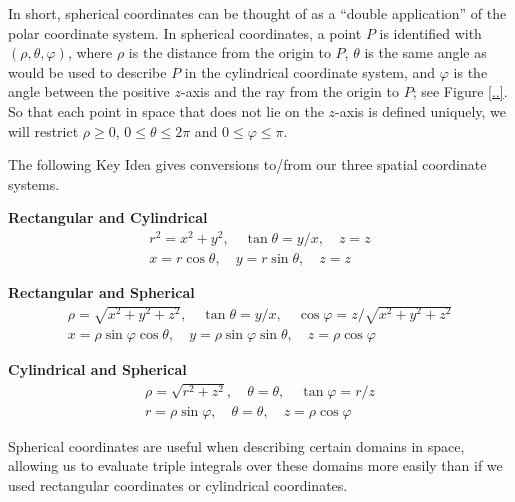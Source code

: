In short, spherical coordinates can be thought of as a ``double application'' of the polar coordinate system. In spherical coordinates, a point $P$ is identified with $(\rho,\theta,\varphi)$, where $\rho$ is the distance from the origin to $P$, $\theta$ is the same angle as would be used to describe $P$ in the cylindrical coordinate system, and $\varphi$ is the angle between the positive $z$-axis and the ray from the origin to $P$; see Figure \ref{..}. So that each point in space that does not lie on the $z$-axis is defined uniquely, we will restrict $\rho \geq 0$, $0 \leq \theta \leq 2\pi$ and $0 \leq \varphi \leq \pi$.

The following Key Idea gives conversions to/from our three spatial coordinate systems.

{\textbf{Rectangular and Cylindrical}
$$\begin{array}{c}
r^2 = x^2+y^2,\quad \tan \theta = y/x,\quad z=z\\
x=r\cos \theta, \quad y=r\sin\theta,\quad z=z
\end{array}$$

\textbf{Rectangular and Spherical}
$$\begin{array}{c}
\rho = \sqrt{x^2+y^2+z^2},\quad \tan \theta = y/x,\quad \cos \varphi = z/\sqrt{x^2+y^2+z^2}\\
x=\rho\sin\varphi\cos\theta,\quad y=\rho\sin\varphi\sin\theta,\quad z=\rho\cos\varphi
\end{array}$$

\textbf{Cylindrical and Spherical }
$$\begin{array}{c}
\rho=\sqrt{r^2+z^2}, \quad \theta = \theta,\quad \tan \varphi = r/z \\
r=\rho \sin \varphi, \quad \theta = \theta, \quad z=\rho\cos\varphi
\end{array}$$ 
}

Spherical coordinates are useful when describing certain domains in space, allowing us to evaluate triple integrals over these domains more easily than if we used rectangular coordinates or cylindrical coordinates.





